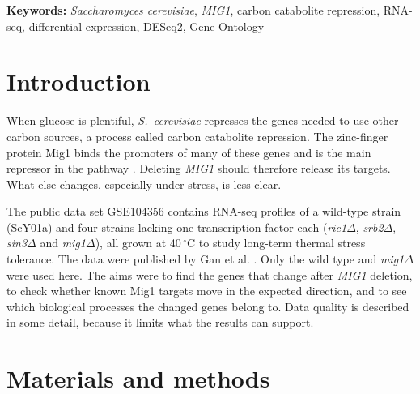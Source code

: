 \documentclass[11pt, a4paper]{article}
\newcommand{\gene}[1]{\textit{#1}}
\newcommand{\mig}{\textit{mig1}$\Delta$}
\newcommand{\degC}{\,$^\circ$C}
\begin{document}
\noindent\textbf{Keywords:} \textit{Saccharomyces cerevisiae}, \gene{MIG1}, carbon catabolite repression, RNA-seq, differential expression, DESeq2, Gene Ontology

\section{Introduction}
When glucose is plentiful, \textit{S.~cerevisiae} represses the genes needed to use other carbon sources, a process called carbon catabolite repression. The zinc-finger protein Mig1 binds the promoters of many of these genes and is the main repressor in the pathway \cite{nehlin1990,gancedo1998}. Deleting \gene{MIG1} should therefore release its targets. What else changes, especially under stress, is less clear.

The public data set GSE104356 \cite{edgar2002} contains RNA-seq profiles of a wild-type strain (ScY01a) and four strains lacking one transcription factor each (\textit{ric1}$\Delta$, \textit{srb2}$\Delta$, \textit{sin3}$\Delta$ and \mig{}), all grown at 40\degC{} to study long-term thermal stress tolerance. The data were published by Gan et al. \cite{gan2021}. Only the wild type and \mig{} were used here. The aims were to find the genes that change after \gene{MIG1} deletion, to check whether known Mig1 targets move in the expected direction, and to see which biological processes the changed genes belong to. Data quality is described in some detail, because it limits what the results can support.

\section{Materials and methods}
\end{document}
